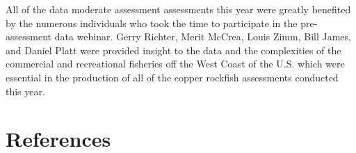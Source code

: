 \documentclass[11pt,
  english,
  a4paper,
]{article}
\begin{document}
\leavevmode\tagmcend\tagstructend\par


All of the data moderate assessment assessments this year were greatly benefited by the numerous individuals who took the time to participate in the pre-assessment data webinar. Gerry Richter, Merit McCrea, Louis Zimm, Bill James, and Daniel Platt were provided insight to the data and the complexities of the commercial and recreational fisheries off the West Coast of the U.S. which were essential in the production of all of the copper rockfish assessments conducted this year.

\leavevmode\tagmcend\tagstructend\par

\newpage

\clearpage


\hypertarget{references}{%
\section{References}\label{references}}

\leavevmode\tagmcend\tagstructend

\end{document}
